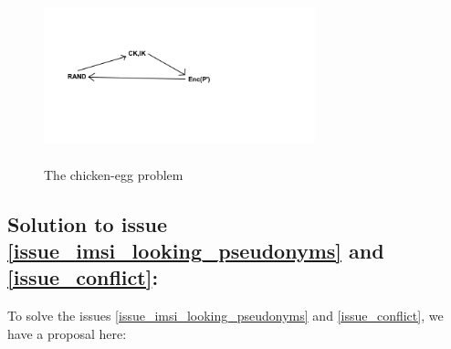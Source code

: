\documentclass[12pt]{article}
\begin{document}
  \begin{figure}[h!]
    \centering
    \includegraphics[width=0.7\textwidth , height = 5cm]{chicken-egg}
    \caption{The chicken-egg problem}
    \label{fig:chicken-egg}
    \end{figure}


\subsection*{Solution to issue \ref{issue_imsi_looking_pseudonyms} and \ref{issue_conflict}:} To solve the issues \ref{issue_imsi_looking_pseudonyms} and \ref{issue_conflict}, we have a proposal here:
\end{document}
